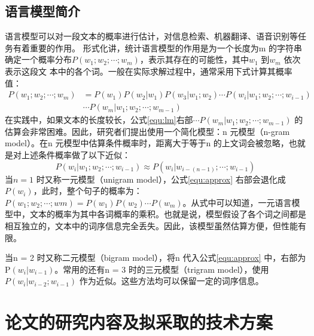\documentclass[12pt,a4paper]{article}
\begin{document}
\subsection{语言模型简介}
语言模型可以对一段文本的概率进行估计，对信息检索、机器翻译、语音识别等任务有着重要的作用。
形式化讲，统计语言模型的作用是为一个长度为m 的字符串确定一个概率分布$P(w_1;w_2;\cdots;w_m)$，表示其存在的可能性，其中$w_1$ 到$w_m$ 依次表示这段文
本中的各个词。一般在实际求解过程中，通常采用下式计算其概率值：
\begin{equation}
\label{equ:lm}
\begin{split}
P(w_1;w_2; \cdots;w_m) &= P(w_1) P(w_2|w_1) P(w_3|w_1;w_2)\cdots P(w_i | w_1;w_2;\cdots;w_{i-1}) \\
&\cdots P(w_m | w_1;w_2;\cdots;w_{m-1})
\end{split}
\end{equation}
在实践中，如果文本的长度较长，公式\ref{equ:lm}右部$\cdots P(w_m | w_1;w_2;\cdots;w_{m-1}) $ 的估算会非常困难。因此，研究者们提出使用一个简化模型：n 元模型（n-gram model）。在n 元模型中估算条件概率时，距离大于等于n 的上文词会被忽略，也就是对上述条件概率做了以下近似：
\begin{equation}
\label{equ:approx}
P(w_i | w_1;w_2;\cdots;w_{i-1})  \approx P(w_i | w_{i-(n-1)};\cdots;w_{i-1})
\end{equation}
当$n = 1$ 时又称一元模型（unigram model），公式\ref{equ:approx} 右部会退化成$P(w_i)$，此时，整个句子的概率为：$P(w_1;w_2; \cdots;wm) = P(w_1)P(w_2) \cdots P(w_m)$。从式中可以知道，一元语言模型中，文本的概率为其中各词概率的乘积。也就是说，模型假设了各个词之间都是相互独立的，文本中的词序信息完全丢失。因此，该模型虽然估算方便，但性能有限。

当n = 2 时又称二元模型（bigram model），将n 代入公式\ref{equ:approx} 中，右部为P$(w_i|w_{i-1})$。常用的还有n = 3 时的三元模型（trigram model），使用$P(w_i |w_{i-2};w_{i-1})$ 作为近似。这些方法均可以保留一定的词序信息。



\section{论文的研究内容及拟采取的技术方案}
\end{document}
